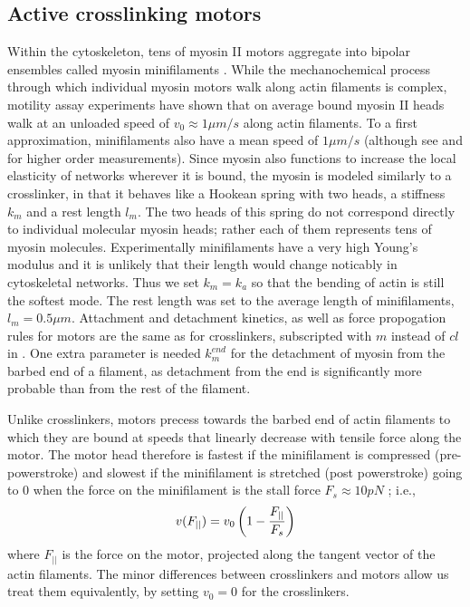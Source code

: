 \documentclass[12pt]{article}
\begin{document}
\subsection{Active crosslinking motors}
Within the cytoskeleton, tens of myosin II motors aggregate into bipolar ensembles called myosin minifilaments
\cite{stam2015}. While the mechanochemical process through which individual myosin motors walk along actin filaments is complex, 
motility assay experiments have shown that on average bound myosin II heads walk at an unloaded speed of $v_0\approx1\mu m/s$ along actin
filaments\cite{finer1994}. To a first approximation, minifilaments also 
have a mean speed of $1\mu m/s$ (although see \cite{stam2015} and \cite{walcott2012} for higher order measurements). 
Since myosin also functions to increase the local elasticity of networks wherever it is bound, the myosin is modeled
similarly to a crosslinker, in that it behaves like a Hookean spring with two heads, a stiffness $k_{m}$ and a rest
length $l_m$. The two heads of this spring do not correspond directly to individual
molecular myosin heads; rather each of them represents tens of myosin molecules. 
Experimentally minifilaments have a very high
Young's modulus and it is unlikely that their length would change noticably in cytoskeletal networks.
Thus we set $k_m=k_a$ so that the bending of actin is still the softest mode. 
The rest length was set to the average length of minifilaments, $l_m=0.5\mu m$\cite{niederman1975}.
Attachment and detachment kinetics, as well as force propogation rules
for motors are the same as for crosslinkers, subscripted with $m$
instead of $cl$ in . One extra parameter is needed $k_m^{end}$ for the
detachment of myosin from the barbed end of a filament, as detachment from the end is significantly more probable than
from the rest of the filament.
\par
Unlike crosslinkers, motors precess towards the barbed end of actin filaments to which they are bound 
at speeds that linearly decrease with tensile force along the motor. 
The motor head therefore is fastest if the minifilament is
compressed (pre-powerstroke) and slowest if the minifilament is stretched (post powerstroke) 
going to $0$ when the force on the minifilament is the stall force $F_s\approx 10pN$ \cite{nedelec2002, gordon2012}; i.e.,  
\begin{equation} 
  v(F_{||}) = v_0\left( 1-{F_{||}\over F_s} \right)
    \label{eqn:myo_vel}
\end{equation} 
where $F_{||}$ is the force on the motor, projected along the tangent vector of the
actin filaments.
The minor differences between crosslinkers and motors allow us treat them equivalently, by 
setting $v_0 = 0$ for the crosslinkers.  
\end{document}
